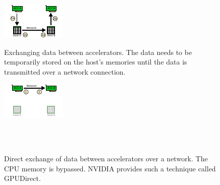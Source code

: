 \begin{figure}[H]
  \begin{minipage}[t]{0.45\textwidth} 
    \includegraphics[width=\textwidth]{graphics/60_acc_memcpy}
    \caption{Exchanging data between accelerators. The data needs to be
    temporarily stored on the host's memories until the data is
    transmitted over a network connection.}
    \label{fig:acc_memcpy}
  \end{minipage}%
  \begin{minipage}[t]{0.1\textwidth}
    \hspace{0.1\textwidth}
  \end{minipage}%
  \begin{minipage}[t]{0.45\textwidth}
    \includegraphics[width=\textwidth]{graphics/60_gpudirect}
    \caption{Direct exchange of data between accelerators over
      a network. The CPU memory is bypassed. NVIDIA provides such a
      technique called GPUDirect.}
    \label{fig:gpudirect}
  \end{minipage}%
  \\
  \\
  

\end{figure}
